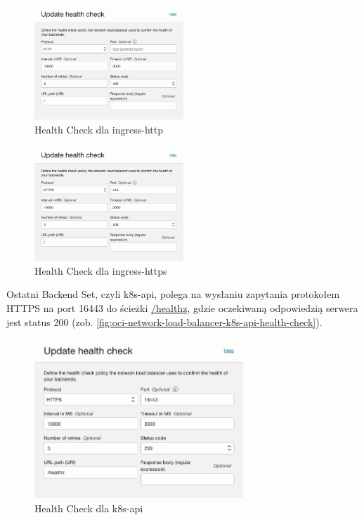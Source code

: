 \begin{multicols}{2}
    \begin{figure}[H]
        \centering
        \includegraphics[width=0.5\textwidth]{img/oci-network-load-balancer-ingress-http-health-check}
        \caption{Health Check dla ingress-http}
        \label{fig:oci-network-load-balancer-ingress-http-health-check}
    \end{figure}
    \begin{figure}[H]
        \centering
        \includegraphics[width=0.5\textwidth]{img/oci-network-load-balancer-ingress-https-health-check}
        \caption{Health Check dla ingress-https}
        \label{fig:oci-network-load-balancer-ingress-https-health-check}
    \end{figure}
\end{multicols}

Ostatni Backend Set, czyli  k8s-api, polega na wysłaniu zapytania protokołem HTTPS na port 16443 do ścieżki \url{/healthz}, gdzie oczekiwaną odpowiedzią serwera jest status 200 (zob. \autoref{fig:oci-network-load-balancer-k8s-api-health-check}).
\begin{figure}[H]
    \centering
    \includegraphics[width=0.7\textwidth]{img/oci-network-load-balancer-k8s-api-health-check}
    \caption{Health Check dla k8s-api}
    \label{fig:oci-network-load-balancer-k8s-api-health-check}
\end{figure}

